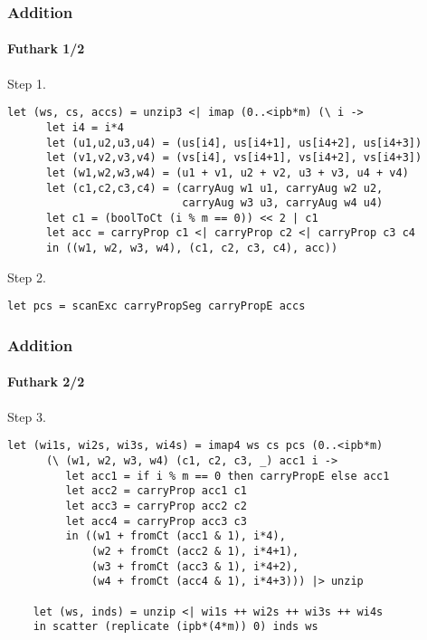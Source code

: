 \begin{frame}[fragile]
  \frametitle{Addition}
  \framesubtitle{Futhark 1/2}
  Step 1.
\begin{lstlisting}[language=futhark,gobble=4,basicstyle=\scriptsize,frame=single,firstnumber=16]
    let (ws, cs, accs) = unzip3 <| imap (0..<ipb*m) (\ i ->
      let i4 = i*4
      let (u1,u2,u3,u4) = (us[i4], us[i4+1], us[i4+2], us[i4+3])
      let (v1,v2,v3,v4) = (vs[i4], vs[i4+1], vs[i4+2], vs[i4+3])
      let (w1,w2,w3,w4) = (u1 + v1, u2 + v2, u3 + v3, u4 + v4)
      let (c1,c2,c3,c4) = (carryAug w1 u1, carryAug w2 u2,
                           carryAug w3 u3, carryAug w4 u4)
      let c1 = (boolToCt (i % m == 0)) << 2 | c1
      let acc = carryProp c1 <| carryProp c2 <| carryProp c3 c4
      in ((w1, w2, w3, w4), (c1, c2, c3, c4), acc))
\end{lstlisting}
  Step 2.
\begin{lstlisting}[language=futhark,gobble=4,basicstyle=\scriptsize,firstnumber=27,frame=single]
    let pcs = scanExc carryPropSeg carryPropE accs
\end{lstlisting}
\end{frame}

\begin{frame}[fragile]
  \frametitle{Addition}
  \framesubtitle{Futhark 2/2}
  Step 3.
\begin{lstlisting}[language=futhark,gobble=4,basicstyle=\scriptsize,firstnumber=28,frame=single]
    let (wi1s, wi2s, wi3s, wi4s) = imap4 ws cs pcs (0..<ipb*m)
      (\ (w1, w2, w3, w4) (c1, c2, c3, _) acc1 i ->
         let acc1 = if i % m == 0 then carryPropE else acc1
         let acc2 = carryProp acc1 c1
         let acc3 = carryProp acc2 c2
         let acc4 = carryProp acc3 c3
         in ((w1 + fromCt (acc1 & 1), i*4),
             (w2 + fromCt (acc2 & 1), i*4+1),
             (w3 + fromCt (acc3 & 1), i*4+2),
             (w4 + fromCt (acc4 & 1), i*4+3))) |> unzip

    let (ws, inds) = unzip <| wi1s ++ wi2s ++ wi3s ++ wi4s
    in scatter (replicate (ipb*(4*m)) 0) inds ws
\end{lstlisting}
\end{frame}

